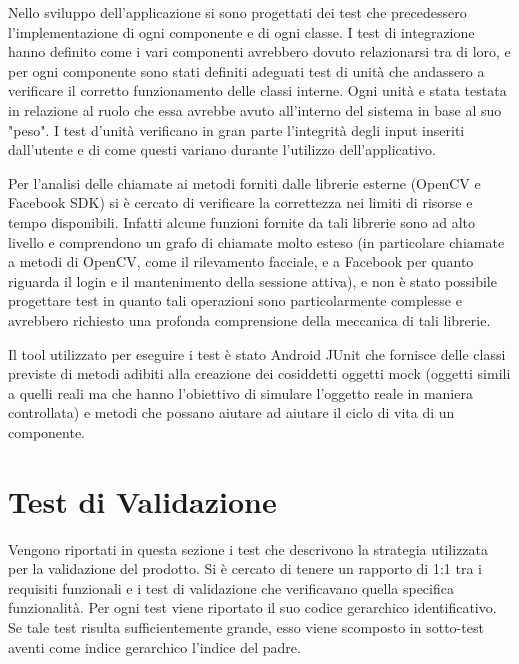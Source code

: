 Nello sviluppo dell'applicazione si sono progettati dei test che precedessero l'implementazione di ogni componente e di ogni classe. I test di integrazione hanno definito come i vari
componenti avrebbero dovuto relazionarsi tra di loro, e per ogni componente sono stati definiti adeguati test di unità che andassero a verificare il corretto funzionamento delle classi interne. Ogni unità e stata testata in
relazione al ruolo che essa avrebbe avuto all'interno del sistema in base al suo "peso".
I test d'unità verificano in gran parte l'integrità degli input inseriti dall'utente e di come questi variano durante l'utilizzo dell'applicativo.

Per l'analisi delle chiamate ai metodi forniti dalle librerie esterne (OpenCV e Facebook SDK) si è cercato di
verificare la correttezza nei limiti di risorse e tempo disponibili. Infatti alcune funzioni fornite da tali librerie sono ad alto livello e comprendono un grafo di chiamate molto esteso
(in particolare chiamate a metodi di OpenCV, come il rilevamento facciale, e a Facebook per quanto riguarda il login e il mantenimento della sessione attiva), e non è stato possibile progettare test in quanto tali operazioni sono
particolarmente complesse e avrebbero richiesto una profonda comprensione della meccanica di tali librerie.

Il tool utilizzato per eseguire i test è stato Android JUnit che fornisce delle classi previste di metodi adibiti alla creazione dei cosiddetti oggetti mock (oggetti simili a quelli reali ma che hanno l'obiettivo di simulare l'oggetto reale in maniera controllata) e metodi che possano aiutare ad aiutare il ciclo di vita di un componente.

\section{Test di Validazione}

Vengono riportati in questa sezione i test che descrivono la strategia utilizzata per la
validazione del prodotto. Si è cercato di tenere un rapporto di 1:1 tra i
requisiti funzionali e i test di validazione che verificavano quella specifica funzionalità.
Per ogni test viene riportato il suo codice gerarchico identificativo. Se tale test risulta sufficientemente grande, esso viene scomposto in sotto-test aventi come indice gerarchico l'indice del padre.

